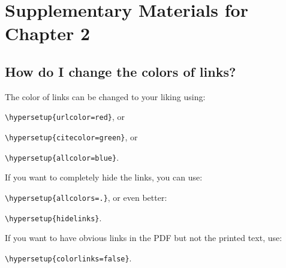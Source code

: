 
\chapter{Supplementary Materials for Chapter 2} %

\label{AppendixA} %

\section{How do I change the colors of links?}

The color of links can be changed to your liking using:

{\small\verb!\hypersetup{urlcolor=red}!}, or

{\small\verb!\hypersetup{citecolor=green}!}, or

{\small\verb!\hypersetup{allcolor=blue}!}.

\noindent If you want to completely hide the links, you can use:

{\small\verb!\hypersetup{allcolors=.}!}, or even better: 

{\small\verb!\hypersetup{hidelinks}!}.

\noindent If you want to have obvious links in the PDF but not the printed text, use:

{\small\verb!\hypersetup{colorlinks=false}!}.
